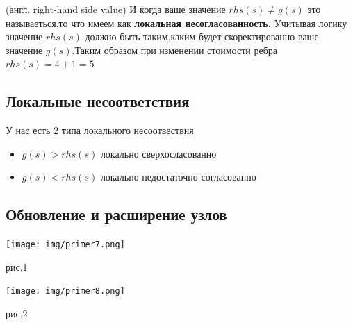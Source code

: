 \documentclass[12pt]{article}
\begin{document}
(англ. right-hand side value) И когда ваше значение $rhs(s)\neq g(s)$ это называеться,то что имеем как \textbf{локальная несогласованность.}
Учитывая логику значение $rhs(s)$ должно быть таким,каким будет скоректированно ваше значение $g(s)$.Таким образом при изменении стоимости ребра $rhs(s)=4+1=5$
\hypertarget{b6}{\subsection*{Локальные несоответствия}}
У нас есть 2 типа локального несоотвествия
\begin{itemize}
    \item $g(s)>rhs(s)$ локально сверхосласованно
    \item $g(s)<rhs(s)$ локально недостаточно согласованно
\end{itemize}
\hypertarget{b7}{\subsection*{Обновление и расширение узлов}}
\begin{center}
        \texttt{[image: img/primer7.png]}
        \caption{рис.1}
        \texttt{[image: img/primer8.png]}
        \caption{рис.2}
\end{center}
\end{document}
